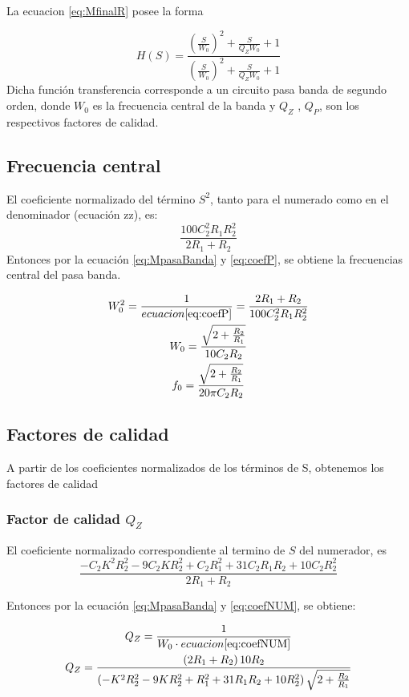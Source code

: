 \documentclass[../../tc_tp3_main.tex]{subfiles}
\begin{document}
La ecuacion \ref{eq:MfinalR} posee la forma

\begin{equation}
H(S)=\frac {\left( \frac{S}{W_0} \right) ^2 + \frac{S}{Q_Z W_0} +1}{\left( \frac{S}{W_0} \right) ^2 +\frac{S}{Q_Z W_0}+1} \label{eq:MpasaBanda}
\end{equation}
Dicha función transferencia corresponde a un circuito pasa banda de segundo orden, donde $W_0$ es la frecuencia central de la banda y $Q_Z$ , $Q_P$, son los respectivos factores de calidad.
\subsection{Frecuencia central}
El coeficiente normalizado del término $S^2$, tanto para el numerado como en el denominador (ecuación zz), es:
\begin{equation}
\frac{100 C_{2}^2 R_{1} R_{2} ^2}{2R_1+R_2}  \label{eq:coefP}
\end{equation}
Entonces por la ecuación \ref{eq:MpasaBanda} y \ref{eq:coefP}, se obtiene la frecuencias central del pasa banda.

\begin{gather}
W_0^2=\frac{1}{ecuacion \ref{eq:coefP}}=\frac{2R_1+R_2}{100 C_{2}^2 R_{1} R_{2} ^2}   \\
W_0=\frac{\sqrt{2+\frac{R_2}{R_1}}}{10C_2 R_2}\\
f_0=\frac{\sqrt{2+\frac{R_2}{R_1}}}{20 \pi C_2 R_2} \label{eq:MfrecCen}
\end{gather}
\subsection{Factores de calidad}
A partir de los coeficientes normalizados de los términos de S, obtenemos los factores de calidad




\subsubsection{Factor de calidad $Q_Z$}
El coeficiente normalizado correspondiente al termino de $S$ del numerador, es
\begin{equation}
\frac{-C_2 K ^2 R_2^2 - 9  C_2 K R_2 ^2 + C_2 R_1^2 +31 C_2 R_1 R_2+10 C_2 R_2^2}{2R_1 +R_2} \label{eq:coefNUM}
\end{equation}


Entonces por la ecuación \ref{eq:MpasaBanda} y \ref{eq:coefNUM}, se obtiene:

\begin{gather}
Q_Z=\frac{1}{W_0 \cdot ecuacion\ref{eq:coefNUM}}\\
Q_Z=\frac{\left( 2R_1 +R_2 \right) 10 R_2 }{\left( - K ^2 R_2^2 - 9   K R_2 ^2 +  R_1^2 +31  R_1 R_2+10  R_2^2 \right)\sqrt{2+\frac{R_2}{R_1}} }
\end{gather}
\end{document}
